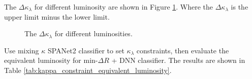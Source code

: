 \documentclass[12pt]{article}
\begin{document}
	The $\Delta \kappa_\lambda$ for different luminosity are shown in Figure \ref{fig:delta_kappa_luminosity_14TeV}. Where the $\Delta\kappa_\lambda$ is the upper limit minus the lower limit.
	\begin{figure}[htpb]
		\centering
		\caption{The $\Delta \kappa_\lambda$ for different luminosities.}
		\label{fig:delta_kappa_luminosity_14TeV}
	\end{figure}

	Use mixing $\kappa$ SPANet2	classifier to set $\kappa_\lambda$ constraints, then evaluate the equivalent luminosity for $\text{min-}\Delta R$ + DNN classifier. The results are shown in Table \ref{tab:kappa_constraint_equivalent_luminosity}.
\end{document}
